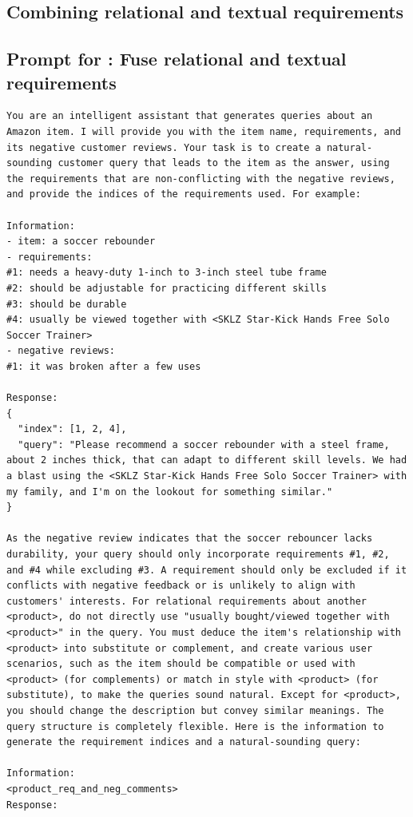 \subsection{Combining relational and textual requirements}
\label{app:fusion}

\begin{mdframed}[backgroundcolor=cyan!5, linecolor=black, linewidth=2pt, innerleftmargin=10pt, innerrightmargin=10pt, innertopmargin=3pt, innerbottommargin=10pt]
\section*{Prompt for \amazont: Fuse relational and textual requirements}
\begin{lstlisting}
You are an intelligent assistant that generates queries about an Amazon item. I will provide you with the item name, requirements, and its negative customer reviews. Your task is to create a natural-sounding customer query that leads to the item as the answer, using the requirements that are non-conflicting with the negative reviews, and provide the indices of the requirements used. For example:

Information:
- item: a soccer rebounder
- requirements:
#1: needs a heavy-duty 1-inch to 3-inch steel tube frame
#2: should be adjustable for practicing different skills
#3: should be durable
#4: usually be viewed together with <SKLZ Star-Kick Hands Free Solo Soccer Trainer>
- negative reviews:
#1: it was broken after a few uses

Response:
{
  "index": [1, 2, 4],
  "query": "Please recommend a soccer rebounder with a steel frame, about 2 inches thick, that can adapt to different skill levels. We had a blast using the <SKLZ Star-Kick Hands Free Solo Soccer Trainer> with my family, and I'm on the lookout for something similar." 
}

As the negative review indicates that the soccer rebouncer lacks durability, your query should only incorporate requirements #1, #2, and #4 while excluding #3. A requirement should only be excluded if it conflicts with negative feedback or is unlikely to align with customers' interests. For relational requirements about another <product>, do not directly use "usually bought/viewed together with <product>" in the query. You must deduce the item's relationship with <product> into substitute or complement, and create various user scenarios, such as the item should be compatible or used with <product> (for complements) or match in style with <product> (for substitute), to make the queries sound natural. Except for <product>, you should change the description but convey similar meanings. The query structure is completely flexible. Here is the information to generate the requirement indices and a natural-sounding query:

Information:
<product_req_and_neg_comments>
Response:
\end{lstlisting}
\end{mdframed}


